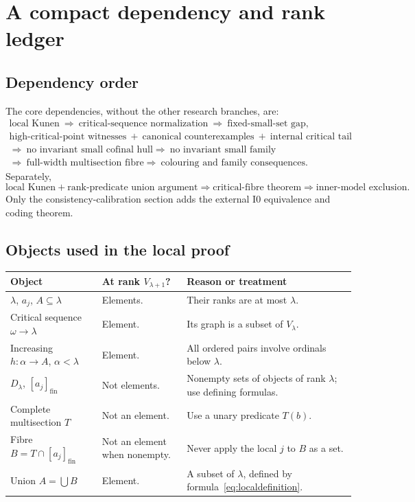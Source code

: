 \documentclass[11pt,letterpaper]{article}
\theoremstyle{definition}
\numberwithin{equation}{section}
\newcommand{\Izero}{\mathrm{I0}}
\newcommand{\cl}[1]{[#1]_{\mathrm{fin}}}
\begin{document}
\newpage
\appendix
\section{A compact dependency and rank ledger}\label{app:ledger}

\subsection{Dependency order}

The core dependencies, without the other research branches, are:
\[
\begin{gathered}
 \text{local Kunen}
 \ \Longrightarrow\ \text{critical-sequence normalization}
 \ \Longrightarrow\ \text{fixed-small-set gap},\\[3pt]
 \text{high-critical-point witnesses}
 \ +\ \text{canonical counterexamples}
 \ +\ \text{internal critical tail}\\
 \Longrightarrow\ \text{no invariant small cofinal hull}
 \Longrightarrow\ \text{no invariant small family}\\
 \Longrightarrow\ \text{full-width multisection fibre}
 \Longrightarrow\ \text{colouring and family consequences}.
\end{gathered}
\]
Separately,
\[
 \text{local Kunen}
 +\text{rank-predicate union argument}
 \Longrightarrow\text{critical-fibre theorem}
 \Longrightarrow\text{inner-model exclusion}.
\]
Only the consistency-calibration section adds the external $\Izero$ equivalence and coding theorem.

\subsection{Objects used in the local proof}

\begin{center}
\small
\renewcommand{\arraystretch}{1.2}
\begin{tabularx}{\textwidth}{@{}P{.31\textwidth}P{.22\textwidth}Y@{}}
\toprule
\textbf{Object}&\textbf{At rank $V_{\lambda+1}$?}&\textbf{Reason or treatment}\\\midrule
$\lambda$, $a_j$, $A\subseteq\lambda$&Elements.&Their ranks are at most $\lambda$.\\
Critical sequence $\omega\to\lambda$&Element.&Its graph is a subset of $V_\lambda$.\\
Increasing $h:\alpha\to A$, $\alpha<\lambda$&Element.&All ordered pairs involve ordinals below $\lambda$.\\
$D_\lambda$, $\cl{a_j}$&Not elements.&Nonempty sets of objects of rank $\lambda$; use defining formulas.\\
Complete multisection $T$&Not an element.&Use a unary predicate $T(b)$.\\
Fibre $B=T\cap\cl{a_j}$&Not an element when nonempty.&Never apply the local $j$ to $B$ as a set.\\
Union $A=\bigcup B$&Element.&A subset of $\lambda$, defined by formula~\eqref{eq:localdefinition}.\\
\bottomrule
\end{tabularx}
\end{center}
\end{document}
